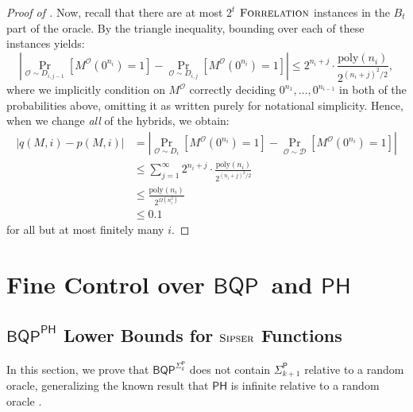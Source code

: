 \documentclass[11pt]{article}%
\newcommand{\poly}{\mathrm{poly}}
\newcommand{\Sipser}{\normalfont\textsc{Sipser}}
\newcommand{\Forrelation}{\normalfont\textsc{Forrelation}}
\begin{document}
\begin{proof}[Proof of ]
Now, recall that there are at most $2^{t}$ $\Forrelation$ instances in the $B_t$ part of the oracle. By the triangle inequality, bounding over each of these instances yields:
\[
\left|\Pr_{\mathcal{O} \sim D_{i, j-1}}\left[M^\mathcal{O}\left(0^{n_i}\right) = 1\right]-\Pr_{\mathcal{O} \sim D_{i, j}}\left[M^\mathcal{O}\left(0^{n_i}\right) = 1 \right]\right| \le 2^{n_i + j} \cdot \frac{\poly(n_i)}{2^{(n_i+j)^2/2}},
\]
where we implicitly condition on $M^\mathcal{O}$ correctly deciding $0^{n_1},\dots,0^{n_{i-1}}$ in both of the probabilities above, omitting it as written purely for notational simplicity. Hence, when we change \textit{all} of the hybrids, we obtain:
\begin{align*}
|q(M, i) - p(M, i)| &= \left|\Pr_{\mathcal{O} \sim D_i}\left[M^\mathcal{O}\left(0^{n_i}\right) = 1\right]-\Pr_{\mathcal{O} \sim \mathcal{D}}\left[M^\mathcal{O}\left(0^{n_i}\right) = 1 \right]\right|\\
&\le \sum_{j=1}^\infty 2^{n_i + j} \cdot \frac{\poly(n_i)}{2^{(n_i + j)^2 / 2}}\\
&\le \frac{\poly(n_i)}{2^{\Omega\left(n_i^2\right)}}\\
&\le 0.1
\end{align*}
for all but at most finitely many $i$.
\end{proof}


\section{Fine Control over \texorpdfstring{$\mathsf{BQP}$}{BQP}\ and \texorpdfstring{$\mathsf{PH}$}{PH}}
\subsection{\texorpdfstring{$\mathsf{BQP}^{\mathsf{PH}}$}{BQP\^{}PH} Lower Bounds for \texorpdfstring{$\Sipser$}{Sipser} Functions}
In this section, we prove that $\mathsf{BQP}^{\mathsf{\Sigma}_k^\mathsf{P}}$ does not contain $\mathsf{\Sigma}_{k+1}^\mathsf{P}$ relative to a random oracle, generalizing the known result that $\mathsf{PH}$ is infinite relative to a random oracle \cite{HRST17,RST15}.
\end{document}
